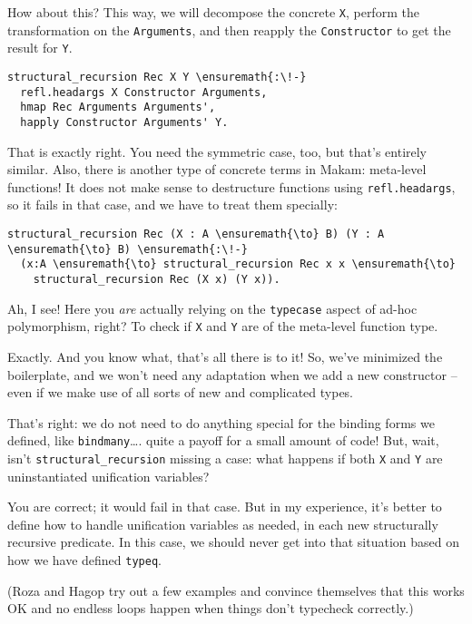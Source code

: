 \heroSTUDENT{} How about this? This way, we will decompose the concrete
\texttt{X}, perform the transformation on the \texttt{Arguments}, and
then reapply the \texttt{Constructor} to get the result for \texttt{Y}.

\importantCodeblock{}

\begin{verbatim}
structural_recursion Rec X Y \ensuremath{:\!-}
  refl.headargs X Constructor Arguments,
  hmap Rec Arguments Arguments',
  happly Constructor Arguments' Y.
\end{verbatim}

\importantCodeblockEnd{}

\heroADVISOR{} That is exactly right. You need the symmetric case, too, but
that's entirely similar. Also, there is another type of concrete terms
in Makam: meta-level functions! It does not make sense to destructure
functions using \texttt{refl.headargs}, so it fails in that case, and we
have to treat them specially:

\importantCodeblock{}

\begin{verbatim}
structural_recursion Rec (X : A \ensuremath{\to} B) (Y : A \ensuremath{\to} B) \ensuremath{:\!-}
  (x:A \ensuremath{\to} structural_recursion Rec x x \ensuremath{\to}
    structural_recursion Rec (X x) (Y x)).
\end{verbatim}

\importantCodeblockEnd{}

\heroSTUDENT{} Ah, I see! Here you \emph{are} actually relying on the
\texttt{typecase} aspect of ad-hoc polymorphism, right? To check if
\texttt{X} and \texttt{Y} are of the meta-level function type.

\heroADVISOR{} Exactly. And you know what, that's all there is to it! So,
we've minimized the boilerplate, and we won't need any adaptation when
we add a new constructor -- even if we make use of all sorts of new and
complicated types.

\heroSTUDENT{} That's right: we do not need to do anything special for the
binding forms we defined, like \texttt{bindmany}\ldots{}. quite a payoff
for a small amount of code! But, wait, isn't
\texttt{structural\_recursion} missing a case: what happens if both
\texttt{X} and \texttt{Y} are uninstantiated unification variables?

\heroADVISOR{} You are correct; it would fail in that case. But in my
experience, it's better to define how to handle unification variables as
needed, in each new structurally recursive predicate. In this case, we
should never get into that situation based on how we have defined
\texttt{typeq}.

\begin{scenecomment}
(Roza and Hagop try out a few examples and convince themselves that this works OK and no endless loops happen when things don't typecheck correctly.)
\end{scenecomment}
